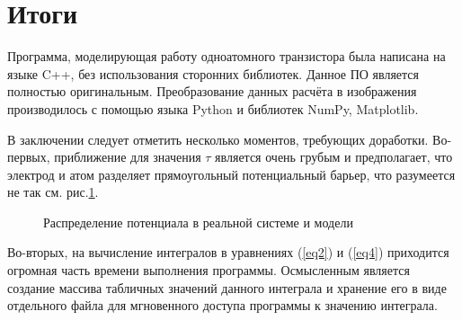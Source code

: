 \documentclass[12pt,a4paper]{report}
\begin{document}
\chapter*{Итоги}
Программа, моделирующая работу одноатомного транзистора была написана на языке C++, без использования сторонних библиотек. Данное ПО является полностью оригинальным. Преобразование данных расчёта в изображения производилось с помощью языка Python и библиотек NumPy, Matplotlib.

В заключении следует отметить несколько моментов, требующих доработки. Во-первых, приближение для значения $\tau$ является очень грубым и предполагает, что электрод и атом разделяет прямоугольный потенциальный барьер, что разумеется не так см. рис.\ref{fig:barrier}. 
\begin{figure}[h!]
	\caption{Распределение потенциала в реальной системе и модели}
	\label{fig:barrier}
\end{figure}

Во-вторых, на вычисление интегралов в уравнениях (\ref{eq2}) и (\ref{eq4}) приходится огромная часть времени выполнения программы. Осмысленным является создание массива табличных значений данного интеграла и хранение его в виде отдельного файла для мгновенного доступа программы к значению интеграла.
\end{document}
